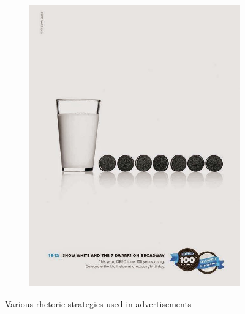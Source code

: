 \documentclass[hidelinks,11pt,a4paper]{report}
\begin{document}
\begin{figure}
\begin{subfigure}[b]{0.12\textwidth}
         \includegraphics[width=\textwidth,scale=0.68]{images/Oreo_SnowWhite.jpeg}
         \caption{}
         \label{fig:oreo}
     \end{subfigure}
     
     
    \caption{Various rhetoric strategies used in advertisements}
    \label{fig:rhetoric-strategies-ads}
\end{figure}
\end{document}
